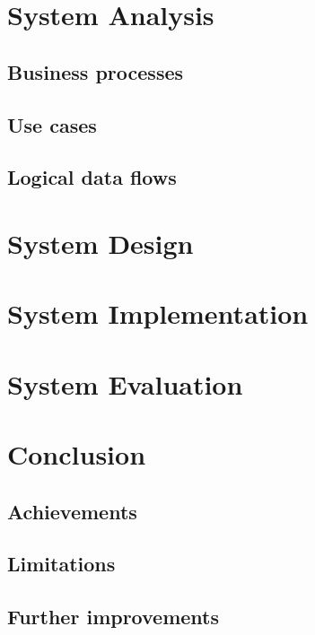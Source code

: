 \section{System Analysis}
\subsection{Business processes}

\subsection{Use cases}


\subsection{Logical data flows}

\newpage
\section{System Design}

\newpage
\section{System Implementation}

\newpage


\section{System Evaluation}

\newpage
\section{Conclusion}
\subsection{Achievements}

\subsection{Limitations}
\subsection{Further improvements}

\newpage